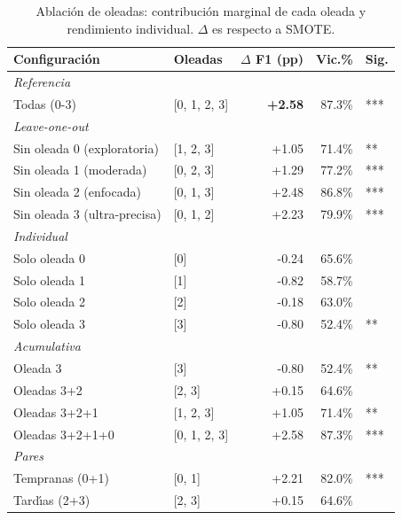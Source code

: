 \begin{table}[htbp]
\centering
\small
\caption{Ablaci\'on de oleadas: contribuci\'on marginal de cada oleada y rendimiento individual. $\Delta$ es respecto a SMOTE.}
\label{tab:wave_ablation}
\begin{tabular}{llrrl}
\toprule
\textbf{Configuraci\'on} & \textbf{Oleadas} & \textbf{$\Delta$ F1 (pp)} & \textbf{Vic.\%} & \textbf{Sig.} \\
\midrule
\multicolumn{5}{l}{\textit{Referencia}} \\
  Todas (0-3) & [0, 1, 2, 3] & \textbf{+2.58} & 87.3\% & *** \\
\midrule
\multicolumn{5}{l}{\textit{Leave-one-out}} \\
  Sin oleada 0 (exploratoria) & [1, 2, 3] & +1.05 & 71.4\% & ** \\
  Sin oleada 1 (moderada) & [0, 2, 3] & +1.29 & 77.2\% & *** \\
  Sin oleada 2 (enfocada) & [0, 1, 3] & +2.48 & 86.8\% & *** \\
  Sin oleada 3 (ultra-precisa) & [0, 1, 2] & +2.23 & 79.9\% & *** \\
\midrule
\multicolumn{5}{l}{\textit{Individual}} \\
  Solo oleada 0 & [0] & -0.24 & 65.6\% &  \\
  Solo oleada 1 & [1] & -0.82 & 58.7\% &  \\
  Solo oleada 2 & [2] & -0.18 & 63.0\% &  \\
  Solo oleada 3 & [3] & -0.80 & 52.4\% & ** \\
\midrule
\multicolumn{5}{l}{\textit{Acumulativa}} \\
  Oleada 3 & [3] & -0.80 & 52.4\% & ** \\
  Oleadas 3+2 & [2, 3] & +0.15 & 64.6\% &  \\
  Oleadas 3+2+1 & [1, 2, 3] & +1.05 & 71.4\% & ** \\
  Oleadas 3+2+1+0 & [0, 1, 2, 3] & +2.58 & 87.3\% & *** \\
\midrule
\multicolumn{5}{l}{\textit{Pares}} \\
  Tempranas (0+1) & [0, 1] & +2.21 & 82.0\% & *** \\
  Tard\'{\i}as (2+3) & [2, 3] & +0.15 & 64.6\% &  \\
\bottomrule
\end{tabular}
\end{table}